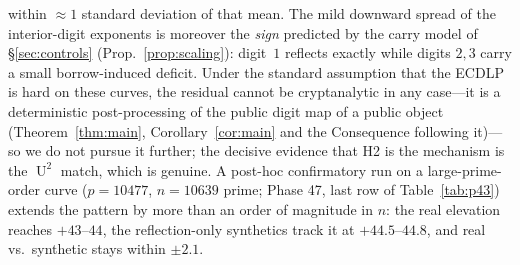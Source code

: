 \documentclass[11pt]{article}
\theoremstyle{definition}
\DeclareMathOperator{\Uk}{U}
\begin{document}
within $\approx1$ standard deviation of that mean. The mild downward
spread of the interior-digit exponents is moreover the \emph{sign}
predicted by the carry model of \S\ref{sec:controls}
(Prop.~\ref{prop:scaling}): digit~$1$ reflects exactly while digits $2,3$
carry a small borrow-induced deficit. Under the standard assumption that
the ECDLP is hard on these curves, the residual cannot be cryptanalytic in
any case---it is a deterministic post-processing of the public digit map
of a public object (Theorem~\ref{thm:main}, Corollary~\ref{cor:main} and
the Consequence following it)---so
we do not pursue it further; the decisive evidence that H2 is the
mechanism is the $\Uk^2$ match, which is genuine. A post-hoc confirmatory
run on a large-prime-order curve ($p=10477$, $n=10639$ prime; Phase 47,
last row of Table~\ref{tab:p43}) extends the pattern by more than an order
of magnitude in $n$: the real elevation reaches $+43$--$44$, the
reflection-only synthetics track it at $+44.5$--$44.8$, and real vs.\
synthetic stays within $\pm2.1$.
\end{document}
